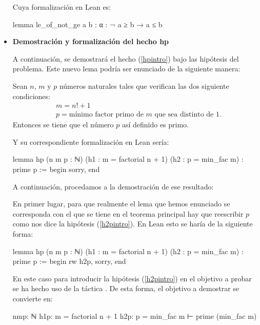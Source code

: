 \begin{itemize}
  Cuya formalización en Lean es:
  \begin{leancode}
  lemma le_of_not_ge {a b : α} : ¬ a ≥ b → a ≤ b
  \end{leancode}

\item \textbf{Demostración y formalización del hecho hp}

  A continuación, se demostrará el hecho (\ref{hpintro}) bajo las hipótesis
  del problema. Este nuevo lema podría ser enunciado de la siguiente manera:
  \begin{lema}
    Sean \(n\), \(m\) y \(p\) números naturales tales que verifican las dos
    siguiente condiciones:
    \begin{align}
      &m=n!+1\tag{h1p}\label{h1pintro}\\
      &p=\text{mínimo factor primo de }m\text{ que sea distinto de }1.\tag{h2p}
        \label{h2pintro}
    \end{align}
    Entonces se tiene que el número \(p\) así definido es primo.
  \end{lema}

  Y su correspondiente formalización en Lean sería:
  \begin{leancode}
lemma hp
  (n m p : ℕ)
  (h1 : m = factorial n + 1)
  (h2 : p = min_fac m)
  : prime p :=
begin
  sorry,
end
  \end{leancode}

  A continuación, procedamos a la demostración de ese resultado:

  \begin{demostracion}

    En primer lugar, para que realmente el lema que hemos enunciado se
    corresponda con el que se tiene en el teorema principal hay que reescribir
    \(p\) como nos dice la hipótesis (\ref{h2pintro}). En Lean esto se haría
    de la siguiente forma:
    \begin{leancode}
lemma hp
  (n m p : ℕ)
  (h1 : m = factorial n + 1)
  (h2 : p = min_fac m)
  : prime p :=
begin
  rw h2p,
  sorry,
end
    \end{leancode}
    En este caso para introducir la hipótesis (\ref{h2pintro}) en el objetivo a
    probar se ha hecho uso de la táctica . De esta
    forma, el objetivo a demostrar se convierte en:
    \begin{leancode}
nmp: ℕ
h1p: m = factorial n + 1
h2p: p = min_fac m
⊢ prime (min_fac m)
    \end{leancode}


\end{demostracion}
\end{itemize}

